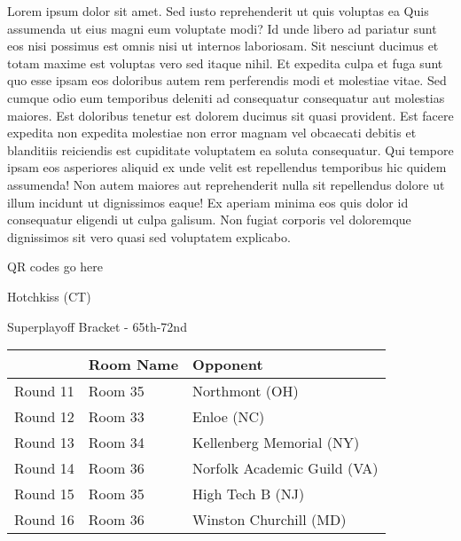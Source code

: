 \documentclass{article}%
\begin{document}
\vspace*{8pt}%
\linebreak%
\newline%
\newline%
    Lorem ipsum dolor sit amet. Sed iusto reprehenderit ut quis voluptas ea Quis assumenda ut eius magni eum voluptate modi? Id unde libero ad pariatur sunt eos nisi possimus est omnis nisi ut internos laboriosam. Sit nesciunt ducimus et totam maxime est voluptas vero sed itaque nihil. Et expedita culpa et fuga sunt quo esse ipsam eos doloribus autem rem perferendis modi et molestiae vitae.\newline%
\newline%
    Sed cumque odio eum temporibus deleniti ad consequatur consequatur aut molestias maiores. Est doloribus tenetur est dolorem ducimus sit quasi provident. Est facere expedita non expedita molestiae non error magnam vel obcaecati debitis et blanditiis reiciendis est cupiditate voluptatem ea soluta consequatur. Qui tempore ipsam eos asperiores aliquid ex unde velit est repellendus temporibus hic quidem assumenda!\newline%
\newline%
    Non autem maiores aut reprehenderit nulla sit repellendus dolore ut illum incidunt ut dignissimos eaque! Ex aperiam minima eos quis dolor id consequatur eligendi ut culpa galisum. Non fugiat corporis vel doloremque dignissimos sit vero quasi sed voluptatem explicabo.\newline%
\newline%
\vspace*{30pt}%
\begin{center}%
\begin{Huge}%
QR codes go here%
\end{Huge}%
\end{center}%
\newpage%
\begin{center}%
\begin{Huge}%
Hotchkiss (CT)%
\end{Huge}%
\vspace*{8pt}%
\linebreak%
\begin{Large}%
Superplayoff Bracket {-} 65th{-}72nd%
\end{Large}%
\end{center}%
%
\begin{tabularx}{\textwidth}{|c|Y|Y|}%
\hline%
&Room Name&Opponent\\%
\hline%
Round 11&Room 35&Northmont (OH)\\%
Round 12&Room 33&Enloe (NC)\\%
Round 13&Room 34&Kellenberg Memorial (NY)\\%
Round 14&Room 36&Norfolk Academic Guild (VA)\\%
Round 15&Room 35&High Tech B (NJ)\\%
Round 16&Room 36&Winston Churchill (MD)\\%
\hline%
\end{tabularx}%
\end{document}
